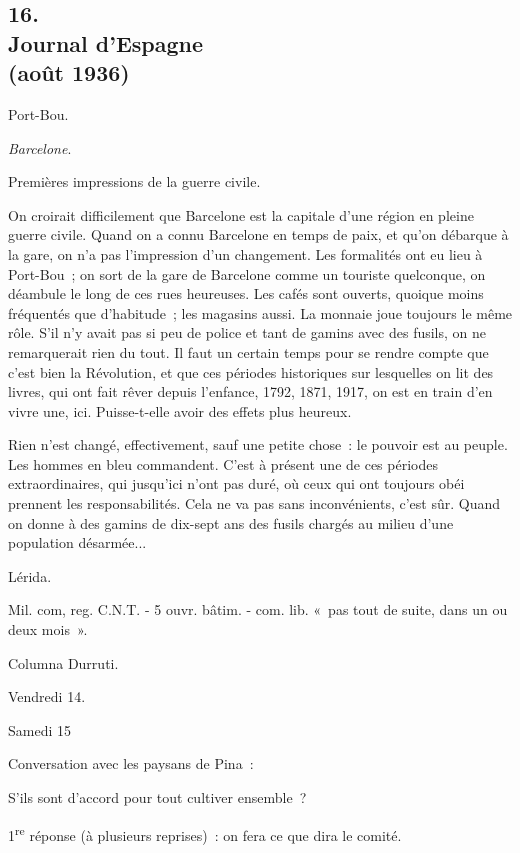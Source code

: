 \documentclass[french,twoside]{book} %
\begin{document}
\subsection[16. Journal d’Espagne, (août 1936)]{16. \\
Journal d’Espagne \\
(août 1936)}
\noindent \par
Port-Bou.\par
{\itshape Barcelone}.\par
Premières impressions de la guerre civile.\par
On croirait difficilement que Barcelone est la capitale d'une région en pleine guerre civile. Quand on a connu Barcelone en temps de paix, et qu'on débarque à la gare, on n'a pas l'impression d'un changement. Les formalités ont eu lieu à Port-Bou ; on sort de la gare de Barcelone comme un touriste quelconque, on déambule le long de ces rues heureuses. Les cafés sont ouverts, quoique moins fréquentés que d'habitude ; les magasins aussi. La monnaie joue toujours le même rôle. S'il n'y avait pas si peu de police et tant de gamins avec des fusils, on ne remarquerait rien du tout. Il faut un certain temps pour se rendre compte que c'est bien la Révolution, et que ces périodes historiques sur lesquelles on lit des livres, qui ont fait rêver depuis l'enfance, 1792, 1871, 1917, on est en train d'en vivre une, ici. Puisse-t-elle avoir des effets plus heureux.\par
Rien n'est changé, effectivement, sauf une petite chose : le pouvoir est au peuple. Les hommes en bleu commandent. C'est à présent une de ces périodes extraordinaires, qui jusqu'ici n'ont pas duré, où ceux qui ont toujours obéi prennent les responsabilités. Cela ne va pas sans inconvénients, c'est sûr. Quand on donne à des gamins de dix-sept ans des fusils chargés au milieu d'une population désarmée...\par
Lérida.\par
Mil. com, reg. C.N.T. - 5 ouvr. bâtim. - com. lib. « pas tout de suite, dans un ou deux mois ».\par
Columna Durruti.\par
Vendredi 14.\par
Samedi 15\par
Conversation avec les paysans de Pina :\par
S'ils sont d'accord pour tout cultiver ensemble ?\par
1\textsuperscript{re} réponse (à plusieurs reprises) : on fera ce que dira le comité.\par
\end{document}
